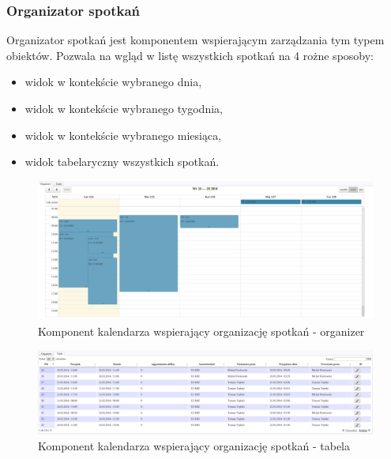 \subsubsection{Organizator spotkań}
	Organizator spotkań jest komponentem wspierającym zarządzania tym typem obiektów. 
	Pozwala na wgląd w listę wszystkich spotkań na 4 rożne sposoby:
	\begin{itemize}
		\item widok w kontekście wybranego dnia,
		\item widok w kontekście wybranego tygodnia,
		\item widok w kontekście wybranego miesiąca,
		\item widok tabelaryczny wszystkich spotkań.
	\end{itemize}
	
	\begin{figure}[H]
		\centering
		\includegraphics[width=1.0\textwidth]{images/calendarComponent-organizer}
		\caption[Komponent kalendarza wspierający organizację spotkań - organizer]{
			Komponent kalendarza wspierający organizację spotkań - organizer		
		}
		\label{app:component_calendar_organizer}
	\end{figure}	
	\begin{figure}[H]
		\centering
		\includegraphics[width=1.0\textwidth]{images/calendarComponent-table}
		\caption[Komponent kalendarza wspierający organizację spotkań - tabela]{
			Komponent kalendarza wspierający organizację spotkań - tabela	
		}
		\label{app:component_calendar_table}
	\end{figure}	
	
